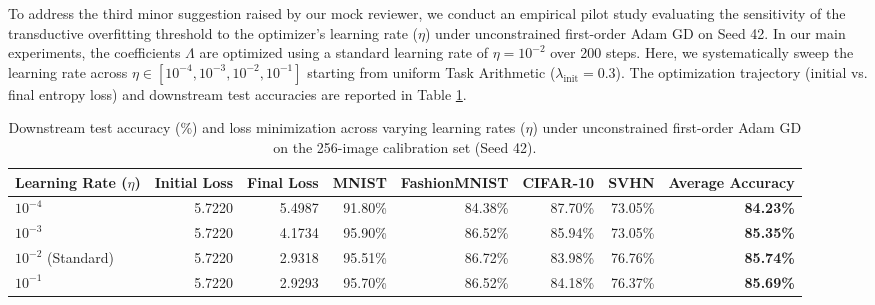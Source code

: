\documentclass{article}
\theoremstyle{plain}
\theoremstyle{definition}
\theoremstyle{remark}
\begin{document}
To address the third minor suggestion raised by our mock reviewer, we conduct an empirical pilot study evaluating the sensitivity of the transductive overfitting threshold to the optimizer's learning rate ($\eta$) under unconstrained first-order Adam GD on Seed 42. In our main experiments, the coefficients $\Lambda$ are optimized using a standard learning rate of $\eta = 10^{-2}$ over 200 steps. Here, we systematically sweep the learning rate across $\eta \in [10^{-4}, 10^{-3}, 10^{-2}, 10^{-1}]$ starting from uniform Task Arithmetic ($\lambda_{\text{init}} = 0.3$). The optimization trajectory (initial vs. final entropy loss) and downstream test accuracies are reported in Table \ref{tab:appendix_learning_rate}.

\begin{table}[h]
\caption{Downstream test accuracy (\%) and loss minimization across varying learning rates ($\eta$) under unconstrained first-order Adam GD on the 256-image calibration set (Seed 42).}
\label{tab:appendix_learning_rate}
\centering
\begin{tabular}{lrrrrrrr}
\toprule
\textbf{Learning Rate ($\eta$)} & \textbf{Initial Loss} & \textbf{Final Loss} & \textbf{MNIST} & \textbf{FashionMNIST} & \textbf{CIFAR-10} & \textbf{SVHN} & \textbf{Average Accuracy} \\
\midrule
$10^{-4}$ & 5.7220 & 5.4987 & 91.80\% & 84.38\% & 87.70\% & 73.05\% & \textbf{84.23\%} \\
$10^{-3}$ & 5.7220 & 4.1734 & 95.90\% & 86.52\% & 85.94\% & 73.05\% & \textbf{85.35\%} \\
$10^{-2}$ (Standard) & 5.7220 & 2.9318 & 95.51\% & 86.72\% & 83.98\% & 76.76\% & \textbf{85.74\%} \\
$10^{-1}$ & 5.7220 & 2.9293 & 95.70\% & 86.52\% & 84.18\% & 76.37\% & \textbf{85.69\%} \\
\bottomrule
\end{tabular}
\end{table}
\end{document}
